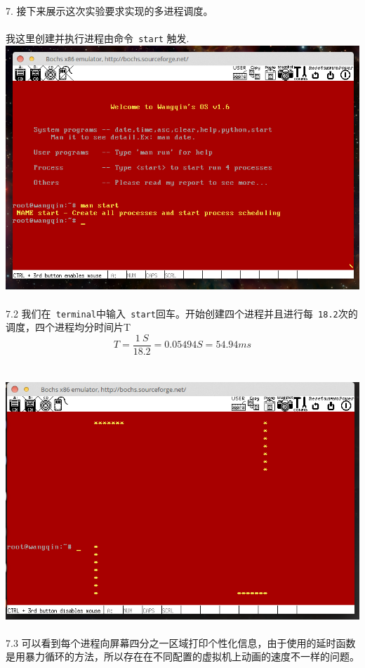 \documentclass[a4paper]{article}
\begin{document}
{7. 接下来展示这次实验要求实现的多进程调度。\\\\
 我这里创建并执行进程由命令\verb| start|  触发.
{\center\includegraphics[scale=0.45]{Illustrations/man_start.png}}\\\\
7.2 我们在\verb| terminal|中输入\verb| start|回车。开始创建四个进程并且进行每\verb| 18.2|次的调度，四个进程均分时间片T\\
\[ T = \frac{1 \ S}{18.2} = 0.05494 S = 54.94 ms \]\\\\
{\center\includegraphics[scale=0.45]{Illustrations/process_start.png}}\\\\
7.3 可以看到每个进程向屏幕四分之一区域打印个性化信息，由于使用的延时函数是用暴力循环的方法，所以存在在不同配置的虚拟机上动画的速度不一样的问题。
}
\end{document}
